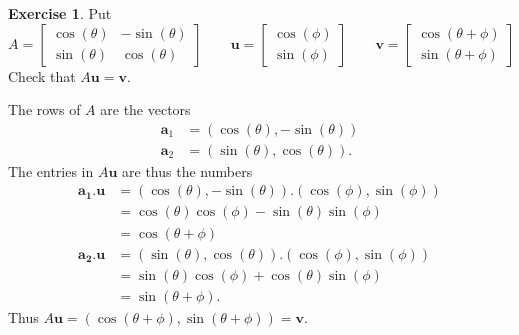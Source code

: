 \documentclass[a4paper]{book}
\newcommand{\tht}       {\theta}
\newcommand{\VEC}[1]    {\mathbf{#1}}
\renewcommand{\:}{\colon}
\theoremstyle{definition}
\newtheorem{exercise}[theorem]{Exercise}
\renewenvironment{solution}{\SolutionInline}{\endSolutionInline}
\begin{document}
\begin{exercise}
 Put
 \[
  A = \begin{bmatrix}
       \cos(\tht) & -\sin(\tht) \\
       \sin(\tht) & \cos(\tht) 
      \end{bmatrix}
  \qquad
  \VEC{u} =
   \begin{bmatrix} \cos(\phi) \\ \sin(\phi) \end{bmatrix}
  \qquad
  \VEC{v} =
   \begin{bmatrix} \cos(\tht+\phi) \\ \sin(\tht+\phi) \end{bmatrix}
 \]
 Check that $A\VEC{u}=\VEC{v}$.
\end{exercise}
\begin{solution}
 The rows of $A$ are the vectors 
 \begin{align*}
  \VEC{a}_1 &= (\cos(\tht),-\sin(\tht)) \\
  \VEC{a}_2 &= (\sin(\tht),\cos(\tht)).
 \end{align*}
 The entries in $A\VEC{u}$ are thus the numbers
 \begin{align*}
  \VEC{a_1}.\VEC{u}
   &= (\cos(\tht),-\sin(\tht)).(\cos(\phi),\sin(\phi)) \\
   &= \cos(\tht)\cos(\phi) - \sin(\tht)\sin(\phi) \\ 
   &= \cos(\tht+\phi) \\
  \VEC{a_2}.\VEC{u}
   &= (\sin(\tht),\cos(\tht)).(\cos(\phi),\sin(\phi)) \\
   &= \sin(\tht)\cos(\phi) + \cos(\tht)\sin(\phi) \\ 
   &= \sin(\tht+\phi).
 \end{align*}
 Thus $A\VEC{u}=(\cos(\tht+\phi),\sin(\tht+\phi))=\VEC{v}$.
\end{solution}
\end{document}
